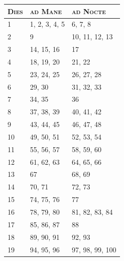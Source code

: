 {
  \newcommand{\cA}{\textbf{\textsc{Dies}}}
  \newcommand{\cB}{\textbf{\textsc{ad Mane}}}
  \newcommand{\cC}{\textbf{\textsc{ad Nocte}}}

  \begin{table}[h]
  \centering
  \begin{tabular}{|l|l|l|}
  \hline
  \cA  & \cB                          & \cC                          \\ \hline
  1    & 1, 2, 3, 4, 5                & 6, 7, 8                      \\ \hline
  2    & 9                            & 10, 11, 12, 13               \\ \hline
  3    & 14, 15, 16                   & 17                           \\ \hline
  4    & 18, 19, 20                   & 21, 22                       \\ \hline
  5    & 23, 24, 25                   & 26, 27, 28                   \\ \hline
  6    & 29, 30                       & 31, 32, 33                   \\ \hline
  7    & 34, 35                       & 36                           \\ \hline
  8    & 37, 38, 39                   & 40, 41, 42                   \\ \hline
  9    & 43, 44, 45                   & 46, 47, 48                   \\ \hline
  10   & 49, 50, 51                   & 52, 53, 54                   \\ \hline
  11   & 55, 56, 57                   & 58, 59, 60                   \\ \hline
  12   & 61, 62, 63                   & 64, 65, 66                   \\ \hline
  13   & 67                           & 68, 69                       \\ \hline
  14   & 70, 71                       & 72, 73                       \\ \hline
  15   & 74, 75, 76                   & 77                           \\ \hline
  16   & 78, 79, 80                   & 81, 82, 83, 84               \\ \hline
  17   & 85, 86, 87                   & 88                           \\ \hline
  18   & 89, 90, 91                   & 92, 93                       \\ \hline
  19   & 94, 95, 96                   & 97, 98, 99, 100              \\ \hline

\end{tabular}
\end{table}}
